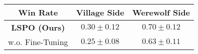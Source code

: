 \begin{tabular}{ccc}
\toprule
Win Rate & Village Side & Werewolf Side \\
\midrule
\textbf{LSPO (Ours)} & $\bm{0.30 \pm 0.12}$ & $\bm{0.70 \pm 0.12}$ \\
w.o. Fine-Tuning & $0.25 \pm 0.08$ & $0.63 \pm 0.11$ \\
\bottomrule
\end{tabular}